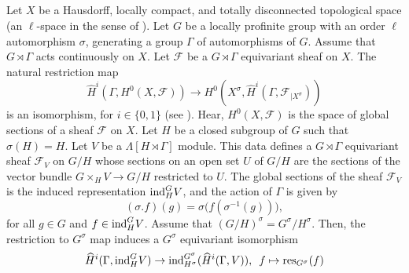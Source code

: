 \documentclass[10pt, reqno]{amsart}
\theoremstyle{plain}
\numberwithin{equation}{section} \newcommand{\di}{\operatorname{dim}}
\begin{document}
\subsection{}
\label{section_kirrilov_rep}
Let $X$ be a Hausdorff, locally compact, and totally disconnected
topological space (an $\ell$-space in the sense of \cite[Section
1.1]{BZ_0}). Let $G$ be a locally profinite group with an order $\ell$
automorphism $\sigma$, generating a group $\Gamma$ of automorphisms of
$G$. Assume that $G\rtimes\Gamma$ acts continuously on $X$. Let
$\mathcal{F}$ be a $G\rtimes\Gamma$ equivariant sheaf on $X$.  The
natural restriction map
$$\widehat{H}^i(\Gamma, H^0(X, \mathcal{F}))\rightarrow H^0(X^\sigma,
\widehat{H}^i(\Gamma, \mathcal{F}_{|X^\sigma}))$$ is an isomorphism,
for $i\in \{0,1\}$ (see \cite[Proposition
3.3]{Treumann_Venkatesh_linkage}).  Hear, $H^0(X, \mathcal{F})$ is the
space of global sections of a sheaf $\mathcal{F}$ on $X$.  Let $H$ be
a closed subgroup of $G$ such that $\sigma(H) = H$. Let $V$ be a
$\Lambda[H\rtimes \Gamma]$ module. This data defines a
$G\rtimes\Gamma$ equivariant sheaf $\mathcal{F}_V$ on $G/H$ whose
sections on an open set $U$ of $G/H$ are the sections of the vector
bundle $G\times_HV\rightarrow G/H$ restricted to $U$. The global
sections of the sheaf $\mathcal{F}_V$ is the induced representation
${\rm ind}_H^GV$, and the action of $\Gamma$ is given by
$$ (\sigma.f)(g)= \sigma\big(f(\sigma^{-1}(g))\big), $$
for all $g\in G$ and $f\in {\rm ind}_H^GV$. 
Assume that $(G/H)^\sigma=G^\sigma/H^\sigma$. 
Then, the restriction to $G^\sigma$ map induces a $G^\sigma$
equivariant isomorphism
\begin{equation}\label{Tate_restriction_map}
\widehat{H}^i(\Gamma, {\rm ind}_H^GV) \rightarrow
{\rm ind}_{H^\sigma}^{G^\sigma}
(\widehat{H}^i(\Gamma, V)),\,\,\, f\mapsto {\rm res}_{G^\sigma}(f)
\end{equation} 
\end{document}
